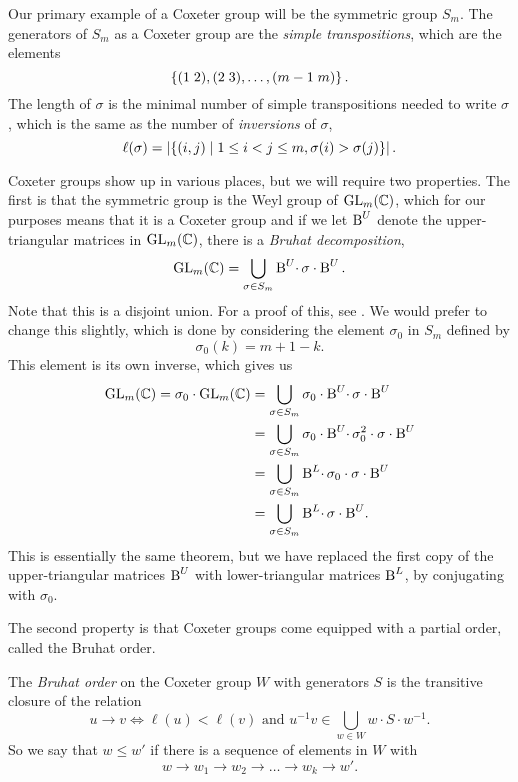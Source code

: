 Our primary example of a Coxeter group will be the
symmetric group $S_m$.
The generators of $S_m$ as a Coxeter group are the \textit{simple
  transpositions}, which are the elements
\[ \left\{ (1\; 2), (2\; 3), \dots, (m-1 \; m)  \right\}. \]
The length of $\sigma$ is the minimal number of simple transpositions
needed to write $\sigma$, which is the same as the number of
\textit{inversions} of $\sigma$,
\[ \ell(\sigma) = \left| \left\{  (i,j) \mid 1\leq i < j\leq m, \sigma(i) >
  \sigma(j) \right\} \right|. \]

Coxeter groups show up in various places, but we will require two
properties. The first is that the symmetric group is the Weyl group of
$\operatorname{GL}_m(\mathbb{C})$, which for our purposes means that it is a Coxeter group
and if we let $\operatorname{B}^U$ denote the upper-triangular matrices in
$\operatorname{GL}_m(\mathbb{C})$, there is a \textit{Bruhat decomposition},
\[ \operatorname{GL}_m(\mathbb{C}) = \bigcup_{\sigma \in S_m} \operatorname{B}^U \!\cdot\, \sigma \cdot \operatorname{B}^U. \]
Note that this is a disjoint union. For a proof of this, see
\cite[Theorem 4.3]{hiller}. We
would prefer to change this slightly, which is done by considering the
element $\sigma_0$ in $S_m$ defined by
\[ \sigma_0(k) = m+1-k. \]
This element is its own inverse, which gives us
\begin{align*}
  \operatorname{GL}_m(\mathbb{C}) = \sigma_0 \cdot \operatorname{GL}_m(\mathbb{C}) &= \bigcup_{\sigma\in S_m}
                                         \sigma_0\cdot \operatorname{B}^U \!\cdot\,
                                         \sigma\cdot \operatorname{B}^U \\
                                       &= \bigcup_{\sigma\in S_m}
                                         \sigma_0\cdot \operatorname{B}^U \!\cdot\,
                                         \sigma_0^2\cdot \sigma \cdot
                                         \operatorname{B}^U \\
                                       &= \bigcup_{\sigma\in S_m}
                                         \operatorname{B}^L\!\cdot\, \sigma_0\cdot
                                         \sigma\cdot \operatorname{B}^U \\
                                       &= \bigcup_{\sigma\in S_m}
                                         \operatorname{B}^L\!\cdot\,\sigma\cdot
                                         \operatorname{B}^U\!.
\end{align*}
This is essentially the same theorem, but we have replaced the first
copy of the upper-triangular matrices $\operatorname{B}^U$ with lower-triangular
matrices $\operatorname{B}^L$, by
conjugating with $\sigma_0$.

The second property is that Coxeter groups come equipped with a
partial order, called the Bruhat order.
\begin{definition}
  \label{def:bruhat-def}
  The \textit{Bruhat order} on the Coxeter group $W$ with generators
  $S$ is the transitive closure of the relation
  \[ u \to v \iff \ell(u) < \ell(v) \text{ and } u^{-1}v \in
  \bigcup_{w\in W} w
  \cdot S \cdot w^{-1}. \]
  So we say that $w \leq w'$ if there is a sequence of elements in $W$
  with
  \[ w \to w_1 \to w_2 \to \dots \to w_k \to w'. \]
\end{definition}

